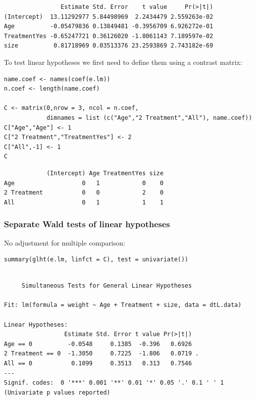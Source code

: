 \documentclass{article}
\begin{document}
\begin{verbatim}
                Estimate Std. Error    t value     Pr(>|t|)
(Intercept)  13.11292977 5.84498969  2.2434479 2.559263e-02
Age          -0.05479836 0.13849481 -0.3956709 6.926272e-01
TreatmentYes -0.65247721 0.36126020 -1.8061143 7.189597e-02
size          0.81718969 0.03513376 23.2593869 2.743182e-69
\end{verbatim}


To test linear hypotheses we first need to define them using a contrast matrix:
\lstset{language=r,label= ,caption= ,captionpos=b,numbers=none}
\begin{lstlisting}
name.coef <- names(coef(e.lm))
n.coef <- length(name.coef)

C <- matrix(0,nrow = 3, ncol = n.coef, 
            dimnames = list (c("Age","2 Treatment","All"), name.coef))
C["Age","Age"] <- 1
C["2 Treatment","TreatmentYes"] <- 2
C["All",-1] <- 1
C
\end{lstlisting}

\begin{verbatim}
            (Intercept) Age TreatmentYes size
Age                   0   1            0    0
2 Treatment           0   0            2    0
All                   0   1            1    1
\end{verbatim}

\subsubsection{Separate Wald tests of linear hypotheses}
\label{sec:org69c2df7}

No adjustment for multiple comparison:
\lstset{language=r,label= ,caption= ,captionpos=b,numbers=none}
\begin{lstlisting}
summary(glht(e.lm, linfct = C), test = univariate())
\end{lstlisting}

\begin{verbatim}

	 Simultaneous Tests for General Linear Hypotheses

Fit: lm(formula = weight ~ Age + Treatment + size, data = dtL.data)

Linear Hypotheses:
                 Estimate Std. Error t value Pr(>|t|)  
Age == 0          -0.0548     0.1385  -0.396   0.6926  
2 Treatment == 0  -1.3050     0.7225  -1.806   0.0719 .
All == 0           0.1099     0.3513   0.313   0.7546  
---
Signif. codes:  0 '***' 0.001 '**' 0.01 '*' 0.05 '.' 0.1 ' ' 1
(Univariate p values reported)
\end{verbatim}
\end{document}
